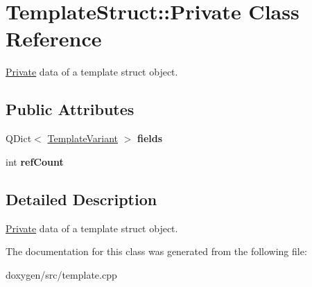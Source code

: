 \hypertarget{class_template_struct_1_1_private}{}\section{Template\+Struct\+::Private Class Reference}
\label{class_template_struct_1_1_private}


\mbox{\hyperlink{class_template_struct_1_1_private}{Private}} data of a template struct object.  


\subsection*{Public Attributes}
\begin{DoxyCompactItemize}
\item 
\mbox{\label{class_template_struct_1_1_private_a9c785278a02a0ef8e5881511e2c0ce7d}} 
Q\+Dict$<$ \mbox{\hyperlink{class_template_variant}{Template\+Variant}} $>$ {\bfseries fields}
\item 
\mbox{\label{class_template_struct_1_1_private_a764293e13d3e06c4a5e9fef7135ce1bb}} 
int {\bfseries ref\+Count}
\end{DoxyCompactItemize}


\subsection{Detailed Description}
\mbox{\hyperlink{class_template_struct_1_1_private}{Private}} data of a template struct object. 

The documentation for this class was generated from the following file\+:\begin{DoxyCompactItemize}
\item 
doxygen/src/template.\+cpp\end{DoxyCompactItemize}
